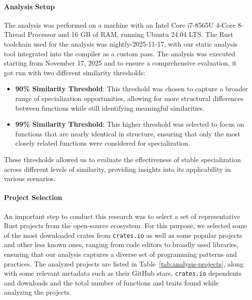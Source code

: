 \paragraph{Analysis Setup}
The analysis was performed on a machine with an Intel Core i7-8565U 4-Core 8-Thread Processor and 16 GB of RAM, running Ubuntu 24.04 LTS.
The Rust toolchain used for the analysis was  nightly-2025-11-17, with our static analysis tool integrated into the compiler as a custom pass.
The analysis was executed starting from November 17, 2025 and to ensure a comprehensive evaluation, it got run with two different similarity thresholds:
\begin{itemize}
	\item \textbf{90\% Similarity Threshold}: This threshold was chosen to capture a broader range of specialization opportunities, allowing for more structural differences between functions while still identifying meaningful similarities.
	\item \textbf{99\% Similarity Threshold}: This higher threshold was selected to focus on functions that are nearly identical in structure, ensuring that only the most closely related functions were considered for specialization.
\end{itemize}
These thresholds allowed us to evaluate the effectiveness of stable specialization across different levels of similarity, providing insights into its applicability in various scenarios.

\paragraph{Project Selection}
An important step to conduct this research was to select a set of representative Rust projects from the open-source ecosystem.
For this purpose, we selected some of the most downloaded crates from \texttt{crates.io} as well as some popular projects and other less known ones, ranging from code editors to broadly used libraries, ensuring that our analysis captures a diverse set of programming patterns and practices.
The analyzed projects are listed in Table~\ref{tab:analysis-projects}, along with some relevant metadata such as their GitHub stars, \texttt{crates.io} dependents and downloads and the total number of functions and traits found while analyzing the projects.

